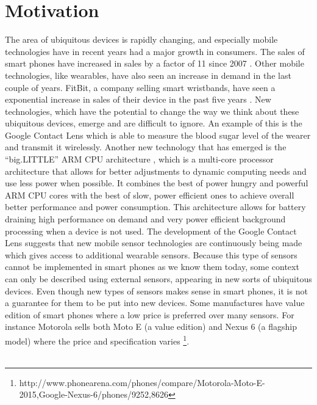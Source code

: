 
\section{Motivation}
\label{sec:motivation}

The area of ubiquitous devices is rapidly changing, and especially mobile technologies have in recent years had a major growth in consumers. The sales of smart phones have increased in sales by a factor of 11 since 2007 \parencite{statsia_smartphones}. Other mobile technologies, like wearables, have also seen an increase in demand in the last couple of years. FitBit, a company selling smart wristbands, have seen a exponential increase in sales of their device in the past five years \parencite{statsia_fitbit}. New technologies, which have the potential to change the way we think about these ubiquitous devices, emerge and are difficult to ignore. An example of this is the Google Contact Lens \parencite{google_contact_lens} which is able to measure the blood sugar level of the wearer and transmit it wirelessly. Another new technology that has emerged is the ``big.LITTLE'' ARM CPU architecture \parencite{big_little_architecture}, which is a multi-core processor architecture that allows for better adjustments to dynamic computing needs and use less power when possible. It combines the best of power hungry and powerful ARM CPU cores with the best of slow, power efficient ones to achieve overall better performance and power consumption. This architecture allows for battery draining high performance on demand and very power efficient background processing when a device is not used. The development of the Google Contact Lens suggests that new mobile sensor technologies are continuously being made which gives access to additional wearable sensors. Because this type of sensors cannot be implemented in smart phones as we know them today, some context can only be described using external sensors, appearing in new sorts of ubiquitous devices. Even though new types of sensors makes sense in smart phones, it is not a guarantee for them to be put into new devices. Some manufactures have value edition of smart phones where a low price is preferred over many sensors. For instance Motorola sells both Moto E (a value edition) and Nexus 6 (a flagship model) where the price and specification varies \footnote{http://www.phonearena.com/phones/compare/Motorola-Moto-E-2015,Google-Nexus-6/phones/9252,8626}.
\\\\

